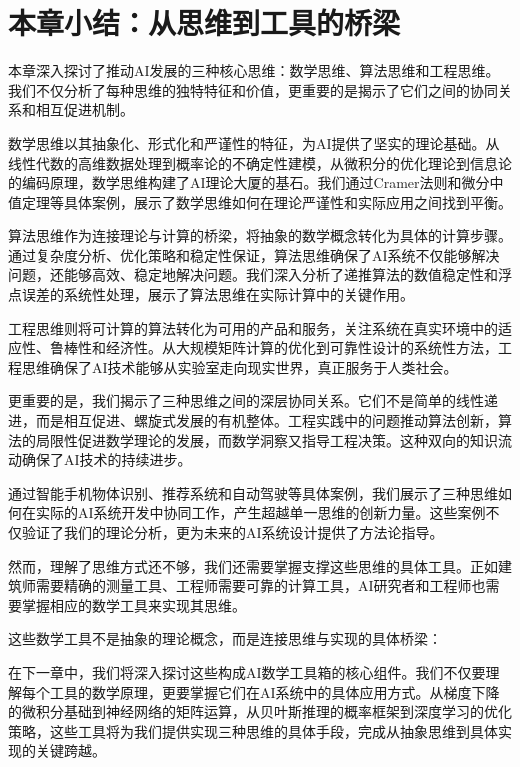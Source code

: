 \section{本章小结：从思维到工具的桥梁}

本章深入探讨了推动AI发展的三种核心思维：数学思维、算法思维和工程思维。我们不仅分析了每种思维的独特特征和价值，更重要的是揭示了它们之间的协同关系和相互促进机制。

数学思维以其抽象化、形式化和严谨性的特征，为AI提供了坚实的理论基础。从线性代数的高维数据处理到概率论的不确定性建模，从微积分的优化理论到信息论的编码原理，数学思维构建了AI理论大厦的基石。我们通过Cramer法则和微分中值定理等具体案例，展示了数学思维如何在理论严谨性和实际应用之间找到平衡。

算法思维作为连接理论与计算的桥梁，将抽象的数学概念转化为具体的计算步骤。通过复杂度分析、优化策略和稳定性保证，算法思维确保了AI系统不仅能够解决问题，还能够高效、稳定地解决问题。我们深入分析了递推算法的数值稳定性和浮点误差的系统性处理，展示了算法思维在实际计算中的关键作用。

工程思维则将可计算的算法转化为可用的产品和服务，关注系统在真实环境中的适应性、鲁棒性和经济性。从大规模矩阵计算的优化到可靠性设计的系统性方法，工程思维确保了AI技术能够从实验室走向现实世界，真正服务于人类社会。

更重要的是，我们揭示了三种思维之间的深层协同关系。它们不是简单的线性递进，而是相互促进、螺旋式发展的有机整体。工程实践中的问题推动算法创新，算法的局限性促进数学理论的发展，而数学洞察又指导工程决策。这种双向的知识流动确保了AI技术的持续进步。

通过智能手机物体识别、推荐系统和自动驾驶等具体案例，我们展示了三种思维如何在实际的AI系统开发中协同工作，产生超越单一思维的创新力量。这些案例不仅验证了我们的理论分析，更为未来的AI系统设计提供了方法论指导。

然而，理解了思维方式还不够，我们还需要掌握支撑这些思维的具体工具。正如建筑师需要精确的测量工具、工程师需要可靠的计算工具，AI研究者和工程师也需要掌握相应的数学工具来实现其思维。

这些数学工具不是抽象的理论概念，而是连接思维与实现的具体桥梁：

在下一章中，我们将深入探讨这些构成AI数学工具箱的核心组件。我们不仅要理解每个工具的数学原理，更要掌握它们在AI系统中的具体应用方式。从梯度下降的微积分基础到神经网络的矩阵运算，从贝叶斯推理的概率框架到深度学习的优化策略，这些工具将为我们提供实现三种思维的具体手段，完成从抽象思维到具体实现的关键跨越。


